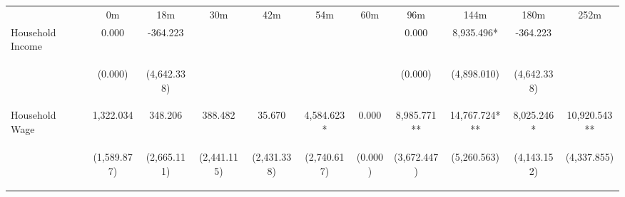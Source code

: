 \begin{tabular}{lcccccccccc}
\hline \noalign{\smallskip} & 0m & 18m & 30m & 42m & 54m & 60m & 96m & 144m & 180m & 252m\\
\noalign{\smallskip}\hline \noalign{\smallskip}Household Income & 0.000 & -364.223 &  &  &  &  & 0.000 & 8,935.496* & -364.223 & \\
 & \begin{footnotesize}(0.000)\end{footnotesize} & \begin{footnotesize}(4,642.338)\end{footnotesize} & \begin{footnotesize}\end{footnotesize} & \begin{footnotesize}\end{footnotesize} & \begin{footnotesize}\end{footnotesize} & \begin{footnotesize}\end{footnotesize} & \begin{footnotesize}(0.000)\end{footnotesize} & \begin{footnotesize}(4,898.010)\end{footnotesize} & \begin{footnotesize}(4,642.338)\end{footnotesize} & \begin{footnotesize}\end{footnotesize}\\
\noalign{\smallskip}Household Wage & 1,322.034 & 348.206 & 388.482 & 35.670 & 4,584.623* & 0.000 & 8,985.771** & 14,767.724*** & 8,025.246* & 10,920.543**\\
 & \begin{footnotesize}(1,589.877)\end{footnotesize} & \begin{footnotesize}(2,665.111)\end{footnotesize} & \begin{footnotesize}(2,441.115)\end{footnotesize} & \begin{footnotesize}(2,431.338)\end{footnotesize} & \begin{footnotesize}(2,740.617)\end{footnotesize} & \begin{footnotesize}(0.000)\end{footnotesize} & \begin{footnotesize}(3,672.447)\end{footnotesize} & \begin{footnotesize}(5,260.563)\end{footnotesize} & \begin{footnotesize}(4,143.152)\end{footnotesize} & \begin{footnotesize}(4,337.855)\end{footnotesize}\\

\end{tabular}
